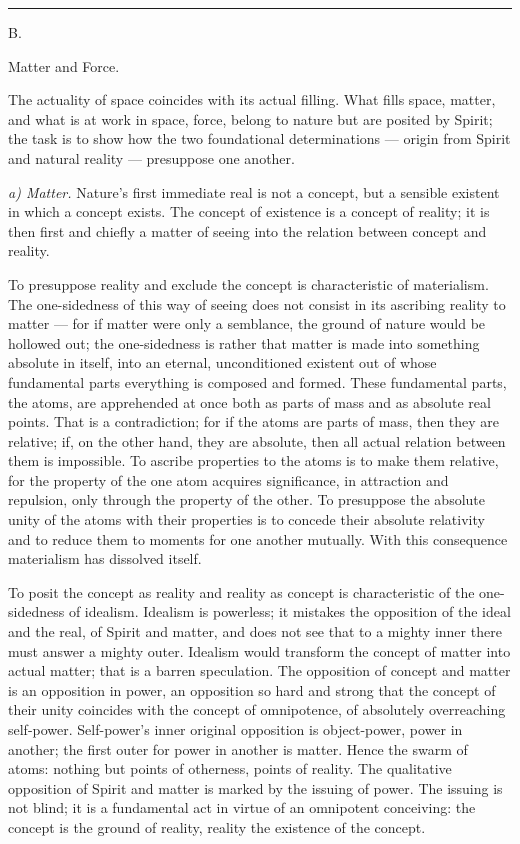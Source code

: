 \documentclass[12pt,a4paper]{book}
\newcommand{\afdeling}[2]{%
  \par\vspace{1.3\baselineskip}%
  {\centering #1\par\vspace{0.2\baselineskip}\normalsize #2\par}%
  \addcontentsline{toc}{section}{#1 #2}%
  \vspace{0.8\baselineskip}\par\nointerlineskip}
\newcommand{\streg}{\begin{center}\rule{2cm}{0.4pt}\end{center}}
\newcommand{\runin}[1]{\emph{#1}\hspace{0.4em}}
\begin{document}
\streg

\afdeling{B.}{Matter and Force.}

The actuality of space coincides with its actual filling. What fills space,
matter, and what is at work in space, force, belong to nature but are posited by
Spirit; the task is to show how the two foundational determinations --- origin
from Spirit and natural reality --- presuppose one another.

\runin{a) Matter.} Nature's first immediate real is not a concept, but a sensible
existent in which a concept exists. The concept of existence is a concept of
reality; it is then first and chiefly a matter of seeing into the relation between
concept and reality.

To presuppose reality and exclude the concept is characteristic of materialism.
The one-sidedness of this way of seeing does not consist in its ascribing reality
to matter --- for if matter were only a semblance, the ground of nature would be
hollowed out; the one-sidedness is rather that matter is made into something
absolute in itself, into an eternal, unconditioned existent out of whose
fundamental parts everything is composed and formed. These fundamental parts, the
atoms, are apprehended at once both as parts of mass and as absolute real points.
That is a contradiction; for if the atoms are parts of mass, then they are
relative; if, on the other hand, they are absolute, then all actual relation
between them is impossible. To ascribe properties to the atoms is to make them
relative, for the property of the one atom acquires significance, in attraction and
repulsion, only through the property of the other. To presuppose the absolute unity
of the atoms with their properties is to concede their absolute relativity and to
reduce them to moments for one another mutually. With this consequence materialism
has dissolved itself.

To posit the concept as reality and reality as concept is characteristic of the
one-sidedness of idealism. Idealism is powerless; it mistakes the opposition of the
ideal and the real, of Spirit and matter, and does not see that to a mighty inner
there must answer a mighty outer. Idealism would transform the concept of matter
into actual matter; that is a barren speculation. The opposition of concept and
matter is an opposition in power, an opposition so hard and strong that the concept
of their unity coincides with the concept of omnipotence, of absolutely overreaching
self-power. Self-power's inner original opposition is object-power, power in
another; the first outer for power in another is matter. Hence the swarm of atoms:
nothing but points of otherness, points of reality. The qualitative opposition of
Spirit and matter is marked by the issuing of power. The issuing is not blind; it is
a fundamental act in virtue of an omnipotent conceiving: the concept is the ground
of reality, reality the existence of the concept.
\end{document}
